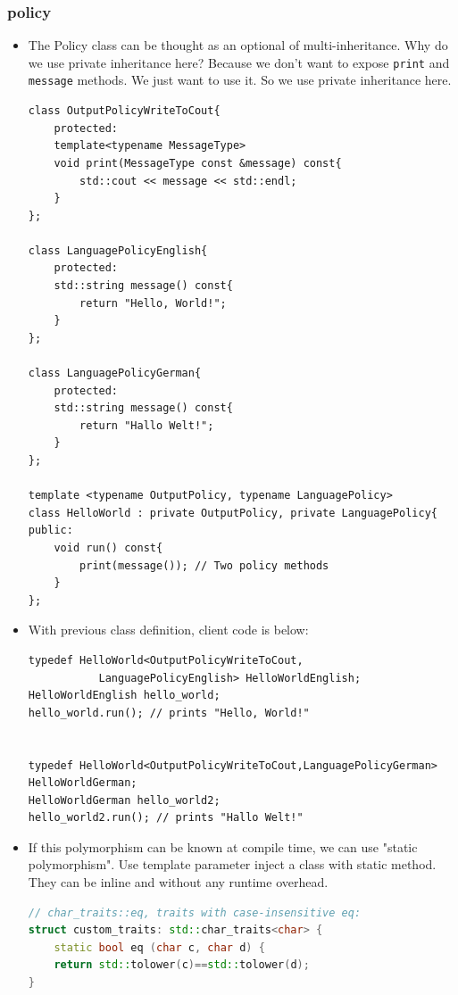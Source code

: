 \documentclass[a4paper,11pt,twoside]{book}
\begin{document}
\subsubsection{policy}
\begin{itemize}
	
	\item The Policy class can be thought as an optional of multi-inheritance. Why do we use private inheritance here? Because we don't want to expose \texttt{print} and \texttt{message} methods. We just want to use it. So we use private inheritance here.
	
\begin{lstlisting}[numbers=none]
class OutputPolicyWriteToCout{
	protected:
	template<typename MessageType>
	void print(MessageType const &message) const{
		std::cout << message << std::endl;
	}
};

class LanguagePolicyEnglish{
	protected:
	std::string message() const{
		return "Hello, World!";
	}
};

class LanguagePolicyGerman{
	protected:
	std::string message() const{
		return "Hallo Welt!";
	}
};

template <typename OutputPolicy, typename LanguagePolicy>
class HelloWorld : private OutputPolicy, private LanguagePolicy{
public:
	void run() const{
		print(message()); // Two policy methods
	}
};
\end{lstlisting}


	\item With previous class definition, client code is below:
\begin{lstlisting}[numbers=none]
typedef HelloWorld<OutputPolicyWriteToCout, 
           LanguagePolicyEnglish> HelloWorldEnglish;
HelloWorldEnglish hello_world;
hello_world.run(); // prints "Hello, World!"


typedef HelloWorld<OutputPolicyWriteToCout,LanguagePolicyGerman> HelloWorldGerman;
HelloWorldGerman hello_world2; 
hello_world2.run(); // prints "Hallo Welt!"
\end{lstlisting}
	
	\item If this polymorphism can be known at compile time, we can use "static polymorphism". Use template parameter inject a class with static method. They can be inline and without any runtime overhead. 
\begin{lstlisting}[frame=single, language=c++]
// char_traits::eq, traits with case-insensitive eq:
struct custom_traits: std::char_traits<char> {
	static bool eq (char c, char d) { 
	return std::tolower(c)==std::tolower(d); 
}
	

\end{lstlisting}
\end{itemize}
\end{document}
